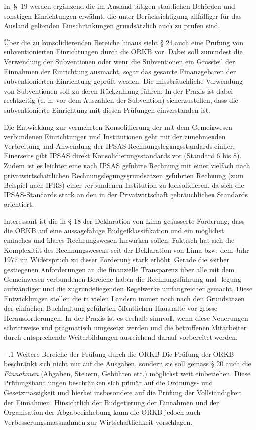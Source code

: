 \documentclass[10pt]{article}
\makeatletter
\renewcommand\subparagraph{\@startsection{subparagraph}{4}{0mm}{-\baselineskip}{.1\baselineskip}{\normalfont\normalsize\bfseries}}
\renewcommand\subparagraph{%
\@startsection{subparagraph}{4}{0mm}%
{-\baselineskip}%
{.1\baselineskip}%
{\normalfont\normalsize\bfseries}}
\makeatother
\begin{document}
In~§~19 werden ergänzend die im Ausland tätigen staatlichen Behörden und sonstigen Einrichtungen erwähnt, die unter Berück­sichtigung allfälliger für das Ausland geltenden Einschränkungen grundsätzlich auch zu prüfen sind.

Über die zu konsolidierenden Bereiche hinaus sieht § 24 auch eine Prüfung von subventionierten Einrichtungen durch die ORKB vor. Dabei soll zumindest die Verwendung der Subventionen oder wenn die Subventionen ein Grossteil der Einnahmen der Einrichtung ausmacht, sogar das gesamte Finanzgebaren der subventionierten Einrichtung geprüft werden. Die missbräuchliche Verwendung von Subventionen soll zu deren Rückzahlung führen. In der Praxis ist dabei rechtzeitig (d. h. vor dem Auszahlen der Subvention) sicherzustellen, dass die subventionierte Einrichtung mit diesen Prüfungen einverstanden ist.

Die Entwicklung zur vermehrten Konsolidierung der mit dem Gemeinwesen verbundenen Einrichtungen und Institutionen geht mit der zunehmenden Verbreitung und Anwendung der IPSAS-Rechnungslegungsstandards einher. Einerseits gibt IPSAS direkt Konsolidierungsstandards vor (Standard 6 bis 8). Zudem ist es leichter eine nach IPSAS geführte Rechnung mit einer vielfach nach privatwirtschaftlichen Rechnungslegungs­grundsätzen geführten Rechnung (zum Beispiel nach IFRS) einer verbundenen Institution zu konsolidieren, da sich die IPSAS-Standards stark an den in der Privatwirtschaft gebräuchlichen Standards orientiert.

Interessant ist die in § 18 der Deklaration von Lima geäusserte Forderung, dass die ORKB auf eine aussagefähige Budgetklassifikation und ein möglichst einfaches und klares Rechnungswesen hinwirken sollen. Faktisch hat sich die Komplexität des Rechnungswesens seit der Deklaration von Lima bzw. dem Jahr 1977 im Widerspruch zu dieser Forderung stark erhöht. Gerade die seither gestiegenen Anforderungen an die finanzielle Transparenz über alle mit dem Gemeinwesen verbundenen Bereiche haben die Rechnungsführung und -legung aufwändiger und die zugrundeliegenden Regelwerke umfangreicher gemacht. Diese Entwicklungen stellen die in vielen Ländern immer noch nach den Grundsätzen der einfachen Buchhaltung geführten öffentlichen Haushalte vor grosse Herausforderungen. In der Praxis ist es deshalb sinnvoll, wenn diese Neuerungen schrittweise und pragmatisch umgesetzt werden und die betroffenen Mitarbeiter durch entsprechende Weiterbildungen ausreichend darauf vorbereitet werden.

\subparagraph{Weitere Bereiche der Prüfung durch die ORKB}\label{subpara:weitere_bereiche_der_pruefung_durch_die_orkb}
Die Prüfung der ORKB beschränkt sich nicht nur auf die Ausgaben, sondern sie soll gemäss § 20 auch die\textit{ Einnahmen} (Abgaben, Steuern, Gebühren etc.) möglichst weit einbeziehen. Diese Prüfungshandlungen beschränken sich primär auf die Ordnungs- und Gesetzmässigkeit und hierbei insbesondere auf die Prüfung der Vollständigkeit der Einnahmen. Hinsichtlich der Budgetierung der Einnahmen und der Organisation der Abgabeeinhebung kann die ORKB jedoch auch Verbesserungsmassnahmen zur Wirtschaftlichkeit vorschlagen.
\end{document}
